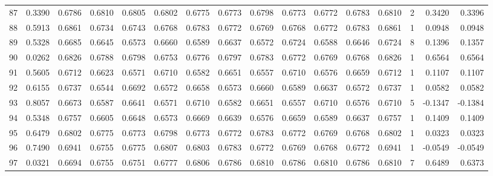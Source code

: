 \begin{tabular}{lrrrrrrrrrrrrrrr}
87  &      0.3390 &  0.6786 &  0.6810 &  0.6805 &  0.6802 &  0.6775 &  0.6773 &  0.6798 &  0.6773 &  0.6772 &   0.6783 &     0.6810 &      2 &                    0.3420 &                     0.3396 \\
88  &      0.5913 &  0.6861 &  0.6734 &  0.6743 &  0.6768 &  0.6783 &  0.6772 &  0.6769 &  0.6768 &  0.6772 &   0.6783 &     0.6861 &      1 &                    0.0948 &                     0.0948 \\
89  &      0.5328 &  0.6685 &  0.6645 &  0.6573 &  0.6660 &  0.6589 &  0.6637 &  0.6572 &  0.6724 &  0.6588 &   0.6646 &     0.6724 &      8 &                    0.1396 &                     0.1357 \\
90  &      0.0262 &  0.6826 &  0.6788 &  0.6798 &  0.6753 &  0.6776 &  0.6797 &  0.6783 &  0.6772 &  0.6769 &   0.6768 &     0.6826 &      1 &                    0.6564 &                     0.6564 \\
91  &      0.5605 &  0.6712 &  0.6623 &  0.6571 &  0.6710 &  0.6582 &  0.6651 &  0.6557 &  0.6710 &  0.6576 &   0.6659 &     0.6712 &      1 &                    0.1107 &                     0.1107 \\
92  &      0.6155 &  0.6737 &  0.6544 &  0.6692 &  0.6572 &  0.6658 &  0.6573 &  0.6660 &  0.6589 &  0.6637 &   0.6572 &     0.6737 &      1 &                    0.0582 &                     0.0582 \\
93  &      0.8057 &  0.6673 &  0.6587 &  0.6641 &  0.6571 &  0.6710 &  0.6582 &  0.6651 &  0.6557 &  0.6710 &   0.6576 &     0.6710 &      5 &                   -0.1347 &                    -0.1384 \\
94  &      0.5348 &  0.6757 &  0.6605 &  0.6648 &  0.6573 &  0.6669 &  0.6639 &  0.6576 &  0.6659 &  0.6589 &   0.6637 &     0.6757 &      1 &                    0.1409 &                     0.1409 \\
95  &      0.6479 &  0.6802 &  0.6775 &  0.6773 &  0.6798 &  0.6773 &  0.6772 &  0.6783 &  0.6772 &  0.6769 &   0.6768 &     0.6802 &      1 &                    0.0323 &                     0.0323 \\
96  &      0.7490 &  0.6941 &  0.6755 &  0.6775 &  0.6807 &  0.6803 &  0.6783 &  0.6772 &  0.6769 &  0.6768 &   0.6772 &     0.6941 &      1 &                   -0.0549 &                    -0.0549 \\
97  &      0.0321 &  0.6694 &  0.6755 &  0.6751 &  0.6777 &  0.6806 &  0.6786 &  0.6810 &  0.6786 &  0.6810 &   0.6786 &     0.6810 &      7 &                    0.6489 &                     0.6373 \\

\end{tabular}
